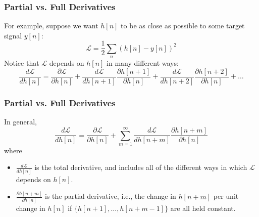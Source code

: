 \documentclass{beamer}
\begin{document}
\begin{frame}
  \frametitle{Partial vs. Full Derivatives}

  For example, suppose we want $h[n]$ to be as close as possible to
  some target signal $y[n]$:
  \[
  {\mathcal L} = \frac{1}{2}\sum_n \left(h[n]-y[n]\right)^2
  \]
  Notice that ${\mathcal L}$ depends on $h[n]$ in many different ways:
  \[
  \frac{d{\mathcal L}}{dh[n]}=\frac{\partial {\mathcal L}}{\partial h[n]}+
  \frac{d{\mathcal L}}{dh[n+1]}\frac{\partial h[n+1]}{\partial h[n]}+
  \frac{d{\mathcal L}}{dh[n+2]}\frac{\partial h[n+2]}{\partial h[n]}+\ldots
  \]
\end{frame}
\begin{frame}
  \frametitle{Partial vs. Full Derivatives}
  In general,
  \[
  \frac{d{\mathcal L}}{dh[n]}=\frac{\partial {\mathcal L}}{\partial h[n]}+
  \sum_{m=1}^\infty\frac{d{\mathcal L}}{dh[n+m]}\frac{\partial h[n+m]}{\partial h[n]}
  \]
  where
  \begin{itemize}
    \item $\frac{d{\mathcal L}}{dh[n]}$ is the total derivative, and includes all
      of the different ways in which ${\mathcal L}$ depends on $h[n]$.
    \item $\frac{\partial h[n+m]}{\partial h[n]}$ is the partial
      derivative, i.e., the change in $h[n+m]$ per unit change in
      $h[n]$ if $\{h[n+1],\ldots,h[n+m-1]\}$ are all held constant.
  \end{itemize}
\end{frame}
\end{document}

